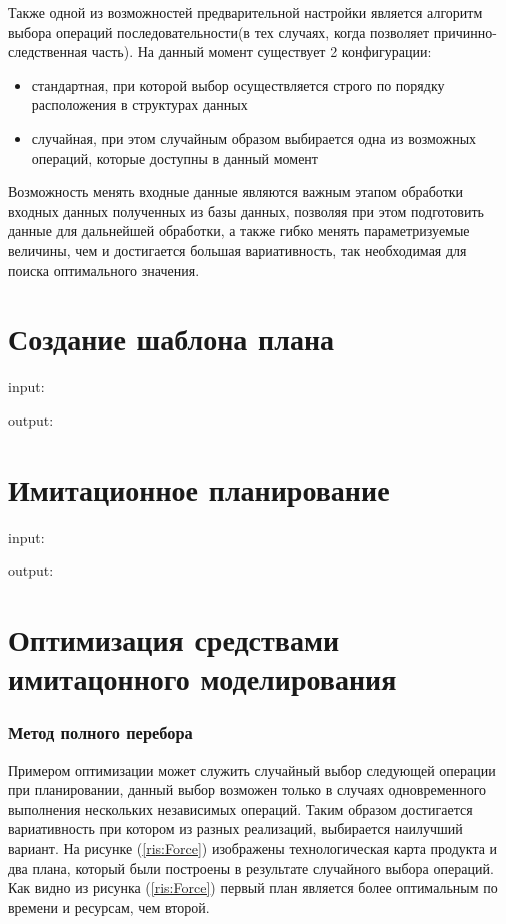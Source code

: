 Также одной из возможностей предварительной настройки является алгоритм выбора операций последовательности(в тех случаях, когда позволяет причинно-следственная часть). На данный момент существует 2 конфигурации:

\begin{itemize}
    \item стандартная, при которой выбор осуществляется строго по порядку расположения в структурах данных
    \item случайная, при этом случайным образом выбирается одна из возможных операций, которые доступны в данный момент 
\end{itemize}

Возможность менять входные данные являются важным этапом обработки входных данных полученных из базы данных, позволяя при этом подготовить данные для дальнейшей обработки, а также гибко менять параметризуемые величины, чем и достигается большая вариативность, так необходимая для поиска оптимального значения. 

\section{Создание шаблона плана}


input:

output:

\section{Имитационное планирование}

input:

output:

\section{Оптимизация средствами имитацонного моделирования}

\subsubsection{Метод полного перебора}
Примером оптимизации может служить случайный выбор следующей операции при планировании, данный выбор возможен только в случаях одновременного выполнения нескольких независимых операций. Таким образом достигается вариативность при котором из разных реализаций, выбирается наилучший вариант. На рисунке (\ref{ris:Force}) изображены технологическая карта продукта и два плана, который были построены в результате случайного выбора операций. Как видно из рисунка (\ref{ris:Force}) первый план является более оптимальным по времени и ресурсам, чем второй.

